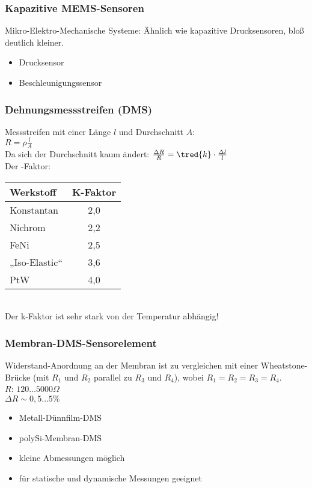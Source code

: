 \subsubsection{Kapazitive MEMS-Sensoren}
Mikro-Elektro-Mechanische Systeme: Ähnlich wie kapazitive Drucksensoren, bloß deutlich kleiner.
\begin{itemize}
\item Drucksensor
\item Beschleunigungssensor
\end{itemize}

\subsubsection{Dehnungsmessstreifen (DMS)}
Messstreifen mit einer Länge $l$ und Durchschnitt $A$:\\
$R=\rho \frac{l}{A}$\\
Da sich der Durchschnitt kaum ändert: $\frac{\Delta R}{R}=\tred{k}\cdot \frac{\Delta l}{l}$\\
Der -Faktor:\\
\begin{tabular}{l | c}
Werkstoff & K-Faktor\\\hline
Konstantan & 2,0\\
Nichrom & 2,2\\
FeNi & 2,5\\
„Iso-Elastic“ & 3,6\\
PtW & 4,0
\end{tabular}\\
Der k-Faktor ist sehr stark von der Temperatur abhängig!

\subsubsection*{Membran-DMS-Sensorelement}
Widerstand-Anordnung an der Membran ist zu vergleichen mit einer Wheatstone-Brücke (mit $R_1$ und $R_2$ parallel zu $R_3$ und $R_4$), wobei $R_1=R_2=R_3=R_4$.\\
$R$: $120\dots5000\unit{\Omega}$\\
$\Delta R \sim 0,5\dots 5\%$
\begin{itemize}
\item Metall-Dünnfilm-DMS
\item polySi-Membran-DMS
\end{itemize}
\begin{itemize}[label=$+$]
\item kleine Abmessungen möglich
\item für statische und dynamische Messungen geeignet
\end{itemize}

